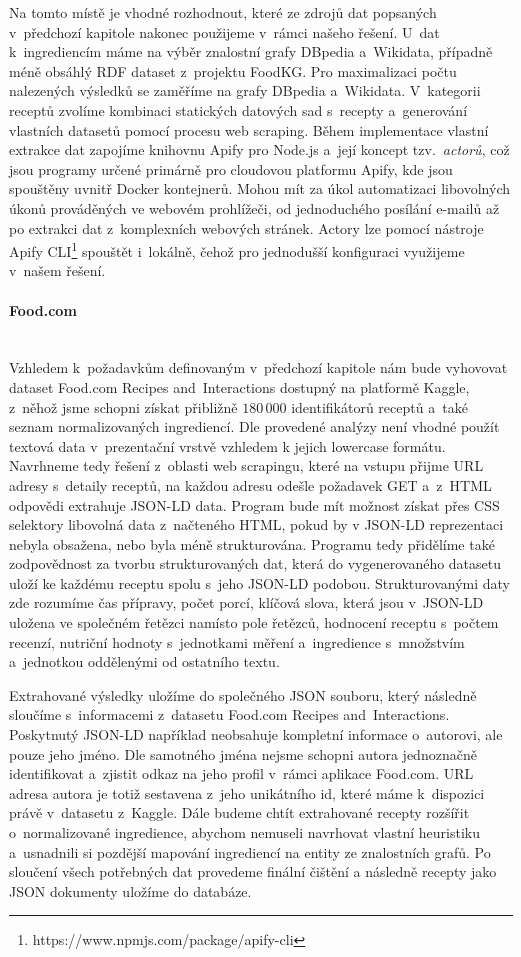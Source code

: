 Na tomto místě je vhodné rozhodnout, které ze zdrojů dat popsaných v~předchozí kapitole nakonec použijeme v~rámci našeho řešení. U~dat k~ingrediencím máme na výběr znalostní grafy DBpedia a~Wikidata, případně méně obsáhlý RDF dataset z~projektu FoodKG. Pro maximalizaci počtu nalezených výsledků se zaměříme na grafy DBpedia a~Wikidata. V~kategorii receptů zvolíme kombinaci statických datových sad s~recepty a~generování vlastních datasetů pomocí procesu web scraping. Během implementace vlastní extrakce dat zapojíme knihovnu Apify pro Node.js a~její koncept tzv.~\emph{actorů}, což jsou programy určené primárně pro cloudovou platformu Apify, kde jsou spouštěny uvnitř Docker kontejnerů. Mohou mít za úkol automatizaci libovolných úkonů prováděných ve webovém prohlížeči, od jednoduchého posílání e-mailů až po extrakci dat z~komplexních webových stránek. Actory lze pomocí nástroje Apify CLI\footnote{https://www.npmjs.com/package/apify-cli} spouštět i~lokálně, čehož pro jednodušší konfiguraci využijeme v~našem řešení.

\paragraph{Food.com}\mbox{}\\

Vzhledem k~požadavkům definovaným v~předchozí kapitole nám bude vyhovovat dataset Food.com Recipes and~Interactions dostupný na platformě Kaggle, z~něhož jsme schopni získat přibližně $180\,000$ identifikátorů receptů a~také seznam normalizovaných ingrediencí. Dle provedené analýzy není vhodné použít textová data v~prezentační vrstvě vzhledem k jejich lowercase formátu. Navrhneme tedy řešení z~oblasti web scrapingu, které na vstupu přijme URL adresy s~detaily receptů, na každou adresu odešle požadavek GET a~z~HTML odpovědi extrahuje JSON-LD data. Program bude mít možnost získat přes CSS selektory libovolná data z~načteného HTML, pokud by v JSON-LD reprezentaci nebyla obsažena, nebo byla méně strukturována. Programu tedy přidělíme také zodpovědnost za tvorbu strukturovaných dat, která do vygenerovaného datasetu uloží ke každému receptu spolu s~jeho JSON-LD podobou. Strukturovanými daty zde rozumíme čas přípravy, počet porcí, klíčová slova, která jsou v~JSON-LD uložena ve společném řetězci namísto pole řetězců, hodnocení receptu s~počtem recenzí, nutriční hodnoty s~jednotkami měření a~ingredience s~množstvím a~jednotkou oddělenými od ostatního textu.

Extrahované výsledky uložíme do společného JSON souboru, který následně sloučíme s~informacemi z~datasetu Food.com Recipes and~Interactions. Poskytnutý JSON-LD například neobsahuje kompletní informace o~autorovi, ale pouze jeho jméno. Dle samotného jména nejsme schopni autora jednoznačně identifikovat a~zjistit odkaz na jeho profil v~rámci aplikace Food.com. URL adresa autora je totiž sestavena z~jeho unikátního id, které máme k~dispozici právě v~datasetu z~Kaggle. Dále budeme chtít extrahované recepty rozšířit o~normalizované ingredience, abychom nemuseli navrhovat vlastní heuristiku a~usnadnili si pozdější mapování ingrediencí na entity ze znalostních grafů. Po sloučení všech potřebných dat provedeme finální čištění a následně recepty jako JSON dokumenty uložíme do databáze.

